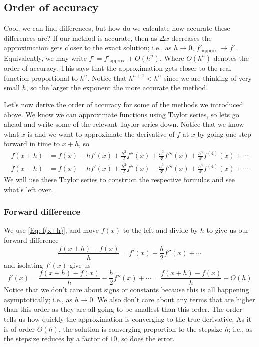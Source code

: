 \documentclass[reqno]{amsart}
\theoremstyle{definition}
\begin{document}
\bigskip
\bigskip
\bigskip
\bigskip

\subsection*{Order of accuracy}

Cool, we can find differences, but how do we calculate how accurate these differences are?  If our method is accurate, then as $\Delta x$ decreases the approximation gets closer to the exact solution; i.e., as $h \rightarrow 0$, $f'_{\text{approx.}} \rightarrow f'$.  Equivalently, we may write $f' = f'_{\text{approx.}} + O(h^n)$.  Where $O(h^n)$ denotes the order of accuracy.  This says that the approximation gets closer to the real function proportional to $h^n$.  Notice that $h^{n+1} < h^n$ since we are thinking of very small $h$, so the larger the exponent the more accurate the method.

Let's now derive the order of accuracy for some of the methods we introduced above.  We know we can approximate functions using Taylor series, so lets go ahead and write some of the relevant Taylor series down.  Notice that we know what $x$ is and we want to approximate the derivative of $f$ at $x$ by going one step forward in time to $x+h$, so
%
\begin{align}
f(x+h) &= f(x) + hf'(x) + \frac{h^2}{2}f''(x) + \frac{h^3}{3!}f'''(x) + \frac{h^4}{4!}f^{(4)}(x) + \cdots\label{Eq: f(x+h)}\\
f(x-h) &= f(x) - hf'(x) + \frac{h^2}{2}f''(x) - \frac{h^3}{3!}f'''(x) + \frac{h^4}{4!}f^{(4)}(x) + \cdots\label{Eq: f(x-h)}
\end{align}
%
We will use these Taylor series to construct the respective formulas and see what's left over.

\subsubsection*{Forward difference}

We use \eqref{Eq: f(x+h)}, and move $f(x)$ to the left and divide by $h$ to give us our forward difference
%
\begin{equation*}
\frac{f(x+h) - f(x)}{h} = f'(x) + \frac{h}{2}f''(x) + \cdots
\end{equation*}
%
and isolating $f'(x)$ give us
%
\begin{equation*}
f'(x) = \frac{f(x+h) - f(x)}{h} - \frac{h}{2}f''(x) + \cdots = \frac{f(x+h) - f(x)}{h} + O(h)
\end{equation*}
%
Notice that we don't care about signs or constants because this is all happening asymptotically; i.e., as $h \rightarrow 0$.  We also don't care about any terms that are higher than this order as they are all going to be smallest than this order.  The order tells us how quickly the approximation is converging to the true derivative.  As it is of order $O(h)$, the solution is converging proportion to the stepsize $h$; i.e., as the stepsize reduces by a factor of $10$, so does the error.
\end{document}
